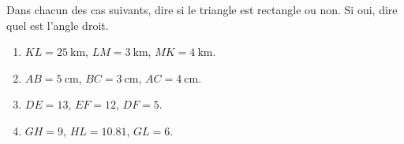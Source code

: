 
\begin{exercice}\label{exosmath-0909}

    Dans chacun des cas suivants, dire si le triangle est rectangle ou non. Si oui, dire quel est l'angle droit.
    \begin{enumerate}
        \item
            \( KL=\SI{25}{\kilo\meter}\), \( LM=\SI{3}{\kilo\meter}\), \( MK=\SI{4}{\kilo\meter}\).
        \item
            \( AB=\SI{5}{\centi\meter}\), \( BC=\SI{3}{\centi\meter}\), \( AC=\SI{4}{\centi\meter}\).
        \item
            \( DE=13\), \( EF=12\), \( DF=5\).
        \item
            \( GH=9\), \( HL=10.81\), \( GL=6\).
    \end{enumerate}

\end{exercice}
